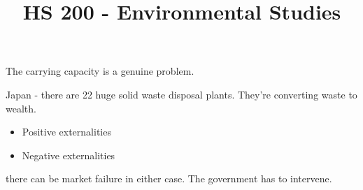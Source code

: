 \documentclass[a4paper]{article}
\title{HS 200 - Environmental Studies}
\date{}
\begin{document}

The carrying capacity is a genuine problem.

Japan - there  are 22 huge solid waste disposal plants. They're
converting waste to wealth. 

\begin{itemize}
	\item Positive externalities
	\item Negative externalities
\end{itemize}
there can be market failure in either case. The government  has to
intervene.

\subsection*{}
\end{document}
